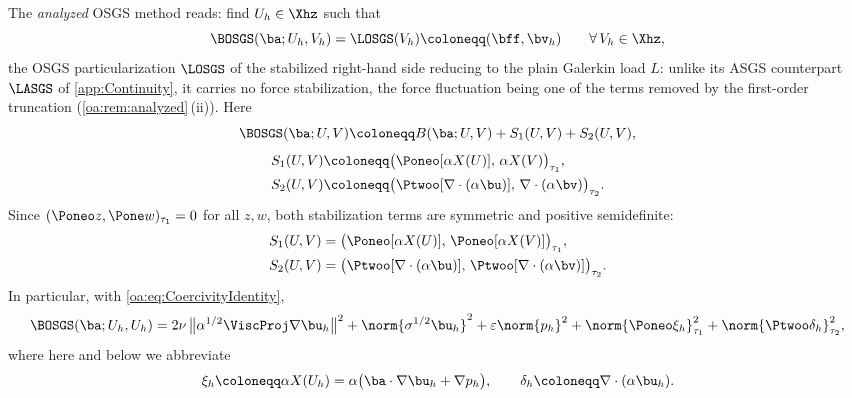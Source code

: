 The \emph{analyzed} OSGS method reads: find $U_h \in \Xhz$ such that
\begin{equation}
  \label{oa:eq:Method}
  \BOSGS(\ba; U_h, V_h) = \LOSGS(V_h) \coloneqq (\bff, \bv_h)
  \qquad \forall\, V_h \in \Xhz,
\end{equation}
the OSGS particularization $\LOSGS$ of the stabilized right{\hyp}hand side reducing to the plain
Galerkin load $L$: unlike its ASGS counterpart $\LASGS$ of \cref{app:Continuity}, it carries no
force stabilization, the force fluctuation being one of the terms removed by the first{\hyp}order
truncation (\cref{oa:rem:analyzed}\,(ii)). Here
\begin{equation}
  \label{oa:eq:Bosgs}
  \BOSGS(\ba; U, V)
  \coloneqq
  B(\ba; U, V) + S_1(U, V) + S_2(U, V),
\end{equation}
\begin{equation}
  \label{oa:eq:Sdefs}
  \begin{aligned}
    S_1(U, V) &\coloneqq \bigl( \Poneo[\alpha X(U)],\, \alpha X(V) \bigr)_{\tau_1}, \\
    S_2(U, V) &\coloneqq \bigl( \Ptwoo[\nabla\cdot(\alpha\bu)],\, \nabla\cdot(\alpha\bv) \bigr)_{\tau_2}.
  \end{aligned}
\end{equation}
Since $(\Poneo z, \Pone w)_{\tau_1} = 0$ for all $z, w$, both stabilization terms are
symmetric and positive semidefinite:
\begin{equation}
  \label{oa:eq:Ssym}
\begin{aligned}
  S_1(U, V) &= \bigl( \Poneo[\alpha X(U)],\, \Poneo[\alpha X(V)] \bigr)_{\tau_1},
  \qquad \\
  S_2(U, V) &= \bigl( \Ptwoo[\nabla\cdot(\alpha\bu)],\, \Ptwoo[\nabla\cdot(\alpha\bv)] \bigr)_{\tau_2}.
\end{aligned}
\end{equation}
In particular, with \cref{oa:eq:CoercivityIdentity},
\begin{equation}
  \label{oa:eq:Diagonal}
  \BOSGS(\ba; U_h, U_h)
  = 2\nu\,\bigl\lVert \alpha^{1/2}\ViscProj\nabla\bu_h \bigr\rVert^2
  + \norm{\sigma^{1/2}\bu_h}^2
  + \varepsilon\norm{p_h}^2
  + \norm{\Poneo \xi_h}_{\tau_1}^2
  + \norm{\Ptwoo \delta_h}_{\tau_2}^2,
\end{equation}
where here and below we abbreviate
\begin{equation}
  \label{oa:eq:XiDelta}
  \xi_h \coloneqq \alpha X(U_h) = \alpha\bigl(\ba\cdot\nabla\bu_h + \nabla p_h\bigr),
  \qquad
  \delta_h \coloneqq \nabla\cdot(\alpha\bu_h).
\end{equation}

